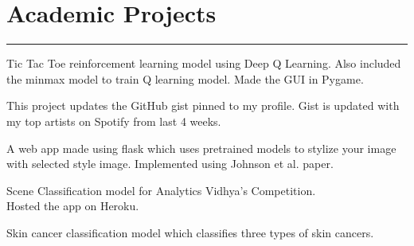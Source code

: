 \documentclass[]{puneet-resume}
\begin{document}
\begin{minipage}[t]{0.66\textwidth}
\section{Academic Projects}
\noindent\rule{12.5cm}{0.4pt}
 
\noindent
\hspace{5em}%
\begin{minipage}{0.85\textwidth\vspace{2pt}}
Tic Tac Toe reinforcement learning model using Deep Q Learning.
Also included the minmax model to train Q learning model.
Made the GUI in Pygame.
\end{minipage}
 
\noindent
\hspace{5em}%
\begin{minipage}{0.85\textwidth\vspace{2pt}}
This project updates the GitHub gist pinned to my profile.
Gist is updated with my top artists on Spotify from last 4 weeks.
\end{minipage}
 
\noindent
\hspace{5em}%
\begin{minipage}{0.85\textwidth\vspace{2pt}}
A web app made using flask which uses pretrained models to stylize your image
with selected style image. Implemented using Johnson et al. paper.
\end{minipage}
 
\noindent
\hspace{5em}%
\begin{minipage}{0.85\textwidth\vspace{2pt}}
Scene Classification model for Analytics Vidhya's Competition.\\
Hosted the app on Heroku.
\end{minipage}
 
\noindent
\hspace{5em}%
\begin{minipage}{0.85\textwidth\vspace{2pt}}
Skin cancer classification model which classifies three types of skin cancers.
\end{minipage}
\end{minipage} 
\end{document}
